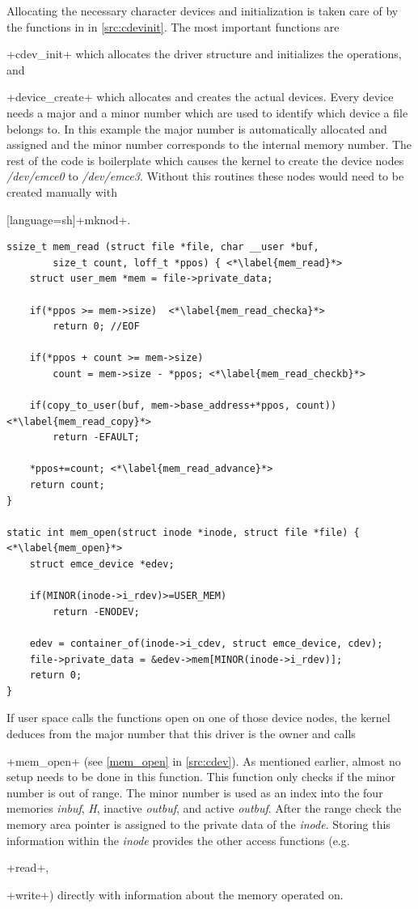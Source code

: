 \documentclass[12pt,a4paper,parskip=full,abstract=true,BCOR=12mm,twoside,open=right]{scrreprt}
\newcommand{\hack}{}
\newcommand*{\SavedLstInline}{}
\DeclareRobustCommand*{\lstinline}{%
  \ifmmode
    \let\SavedBGroup\bgroup
    \def\bgroup{%
      \let\bgroup\SavedBGroup
      \hbox\bgroup
    }%
  \fi
  \SavedLstInline
}
\def\device#1{\textit{#1}}
\begin{document}
Allocating the necessary character devices and initialization is taken care of
by the functions in  in \cref{src:cdevinit}.
The most important functions are \lstinline+cdev_init+ which allocates the driver structure
and initializes the operations, and \lstinline+device_create+ which allocates
and creates the actual devices\cite{ldd}. Every device needs a major and a minor number
which are used to identify which device a file belongs to. In this example the
major number is automatically allocated and assigned and the minor number
corresponds to the internal memory number. The rest of the code is boilerplate
which causes the kernel to create the device nodes \mbox{\device{/dev/emce0}} to
\mbox{\device{/dev/emce3}}. Without this routines these nodes would need to be created
manually with \lstinline[language=sh]+mknod+.

\begin{lstlisting}[float=htb,caption={Character device access functions},label=src:cdev,basicstyle=\hack\scriptsize]
ssize_t mem_read (struct file *file, char __user *buf,
		size_t count, loff_t *ppos) { <*\label{mem_read}*>
	struct user_mem *mem = file->private_data;

	if(*ppos >= mem->size)  <*\label{mem_read_checka}*>
		return 0; //EOF

	if(*ppos + count >= mem->size)
		count = mem->size - *ppos; <*\label{mem_read_checkb}*>

	if(copy_to_user(buf, mem->base_address+*ppos, count)) <*\label{mem_read_copy}*>
		return -EFAULT;

	*ppos+=count; <*\label{mem_read_advance}*>
	return count;
}

static int mem_open(struct inode *inode, struct file *file) { <*\label{mem_open}*>
	struct emce_device *edev;

	if(MINOR(inode->i_rdev)>=USER_MEM)
		return -ENODEV;

	edev = container_of(inode->i_cdev, struct emce_device, cdev);
	file->private_data = &edev->mem[MINOR(inode->i_rdev)];
	return 0;
}
\end{lstlisting}

If user space calls the functions open on one of those device nodes, the
kernel deduces from the major number that this driver is the owner and calls
\lstinline+mem_open+ (see \cref{mem_open} in \cref{src:cdev}). As mentioned earlier,
almost no setup needs to be done in this function. This function only checks if
the minor number is out of range. The minor number is used as an index
into the four memories \device{inbuf}, \device{H}, inactive \device{outbuf}, and
active \device{outbuf}. After the range check the memory area pointer is assigned
to the private data of the \device{inode}\cite{ldd}. Storing this information within the
\device{inode} provides the other access functions (e.g. \lstinline+read+,
\lstinline+write+) directly with information about the memory operated on.
\end{document}
